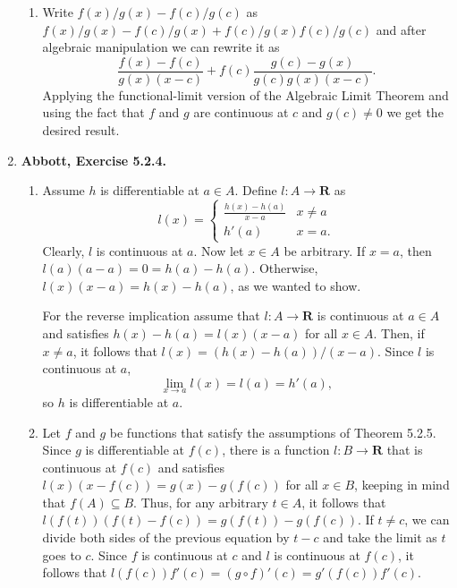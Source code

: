 \documentclass{article}
\newcommand{\R}{\mathbf{R}}
\newcommand{\exc}[2][Abbott]{\item \textbf{#1, Exercise #2.}}
\begin{document}
\begin{enumerate}
\begin{enumerate}
        \item Write $f(x)/g(x) - f(c)/g(c)$ as $f(x)/g(x) - f(c)/g(x) + f(c)/g(x) f(c)/g(c)$ and after algebraic manipulation we can rewrite it as
        \begin{equation*}
            \frac{f(x)-f(c)}{g(x) (x-c)} + f(c) \frac{g(c) - g(x)}{g(c) g(x) (x-c)}.
        \end{equation*} Applying the functional-limit version of the Algebraic Limit Theorem and using the fact that $f$ and $g$ are continuous at $c$ and $g(c) \neq 0$ we get the desired result.
    \end{enumerate}
    
    \exc{5.2.4}
    \begin{enumerate}
        \item Assume $h$ is differentiable at $a \in A$. Define $l: A \to \R$ as 
        \begin{equation*}
            l(x) = \begin{cases}
                \frac{h(x)-h(a)}{x-a} & x \neq a \\ 
                h'(a) & x = a.
            \end{cases}
        \end{equation*} Clearly, $l$ is continuous at $a$. Now let $x \in A$ be arbitrary. If $x = a$, then $l(a)(a-a) = 0 = h(a) - h(a)$. Otherwise, $l(x) (x-a) = h(x)-h(a)$, as we wanted to show. 
        
        For the reverse implication assume that $l : A \to \R$ is continuous at $a \in A$ and satisfies $h(x)-h(a) = l(x) (x-a)$ for all $x \in A$. Then, if $x \neq a$, it follows that $l(x) = (h(x)-h(a)) / (x-a)$. Since $l$ is continuous at $a$, 
        \begin{equation*}
            \lim_{x \to a} l(x) = l(a) = h'(a),
        \end{equation*} so $h$ is differentiable at $a$.
        
        \item Let $f$ and $g$ be functions that satisfy the assumptions of Theorem 5.2.5. Since $g$ is differentiable at $f(c)$, there is a function $l : B \to \R$ that is continuous at $f(c)$ and satisfies $l(x) (x-f(c)) = g(x)- g(f(c))$ for all $x \in B$, keeping in mind that $f(A) \subseteq B$. Thus, for any arbitrary $t \in A$, it follows that $l(f(t)) (f(t)-f(c)) = g(f(t)) - g(f(c))$. If $t \neq c$, we can divide both sides of the previous equation by $t-c$ and take the limit as $t$ goes to $c$. Since $f$ is continuous at $c$ and $l$ is continuous at $f(c)$, it follows that $l(f(c)) f'(c) = (g \circ f)'(c) = g'(f(c)) f'(c)$.
    \end{enumerate}
    

\end{enumerate}
\end{document}
